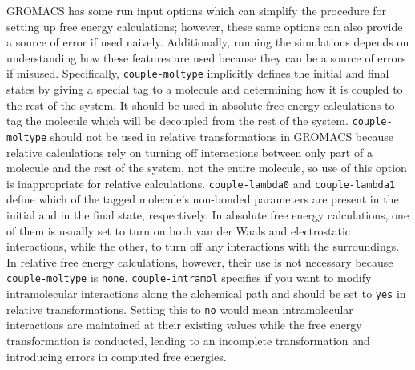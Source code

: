 \documentclass[journal=jctcce,manuscript=article]{achemso}
\begin{document}

GROMACS has some run input options which can simplify the procedure for setting up 
free energy calculations; however, these same options can also provide a source of error
if used naively. Additionally, running the simulations depends on understanding how these 
features are used because they can be a source of errors if misused. Specifically, 
\texttt{couple-moltype} implicitly defines the initial and final states by giving a special tag
to a molecule and determining how it is coupled to the rest of the system.
It should be used in absolute free energy calculations to tag the molecule which will be 
decoupled from the rest of the system. \texttt{couple-moltype} should not be used in 
relative transformations in GROMACS because relative calculations rely on turning off 
interactions between only part of a molecule and the rest of the system, not the entire 
molecule, so use of this option is inappropriate for relative calculations. 
\texttt{couple-lambda0} and \texttt{couple-lambda1} define which of the tagged 
molecule's non-bonded parameters are present in the initial and in the final state, respectively. In absolute free energy 
calculations, one of them is usually set to turn on both van der Waals and electrostatic 
interactions, while the other, to turn off any interactions with the surroundings.
In relative free energy calculations, however, their use is not necessary because 
\texttt{couple-moltype} is \texttt{none}. 
\texttt{couple-intramol}  specifies if you want to modify intramolecular interactions along the alchemical 
path and should be set to \texttt{yes} in relative transformations. Setting this to \texttt{no}
would mean intramolecular interactions are maintained at their existing values while the 
free energy transformation is conducted, leading to an incomplete transformation and introducing 
errors in computed free energies.
\end{document}
